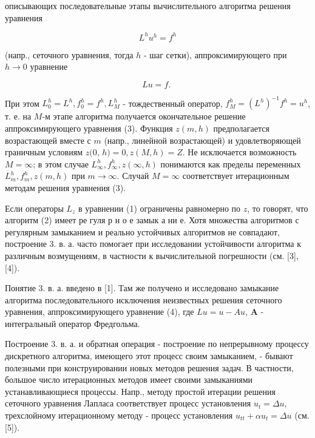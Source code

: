\documentclass[10pt]{article}
\begin{document}
описывающих последовательные этапы вычислительного алгоритма решения уравнения



\[

L^{h} u^{h}=f^{h}

\]



(напр., сеточного уравнения, тогда $h$ - шаг сетки), аппроксимирующего при $h \rightarrow 0$ уравнение



\[

L u=f \text {. }

\]



При этом $L_{0}^{h}=L^{h}, f_{0}^{h}=f^{h}, L_{M}^{h}$ - тождественный оператор, $f_{M}^{h}=\left(L^{h}\right)^{-1} f^{h}=u^{h}$, т. е. на $M$-м этапе алгоритма получается окончательное решение аппроксимирующего уравнения (3). Функция $z(m, h)$ предполагается возрастающей вместе с $m$ (напр., линейной возрастающей) и удовлетворяющей граничным условиям $z(0$, $h)=0, z(M, h)=Z$. Не исключается возможность $M=\infty$; в этом случае $L_{\infty}^{h}, f_{\infty}^{h}, z(\infty, h)$ понимаются как пределы переменных $L_{m}^{h}, f_{m}^{h}, z(m, h)$ при $m \rightarrow \infty$. Случай $M=\infty$ соответствует итерационным методам решения уравнения (3).



Если операторы $L_{z}$ в уравнении (1) ограничены равномерно по $z$, то говорят, что алгоритм (2) имеет ре гуля р н о е замык а ни е. Хотя множества алгоритмов с регулярным замыканием и реально устойчивых алгоритмов не совпадают, построение 3. в. а. часто помогает при исследовании устойчивости алгоритма к различным возмущениям, в частности к вычислительной погрешности (см. [3], [4]).



Понятие 3. в. а. введено в [1]. Там же получено и исследовано замыкание алгоритма последовательного исключения неизвестных решения сеточного уравнения, аппроксимирующего уравнение (4), где $L u=u-A u$, $\boldsymbol{A}$ - интегральный оператор Фредгольма.



Построение 3. в. а. и обратная операция - построение по непрерывному процессу дискретного алгоритма, имеющего этот процесс своим замыканием, - бывают полезными при конструировании новых методов решения задач. В частности, большое число итерационных методов имеет своими замыканиями устанавливающиеся процессы. Напр., методу простой итерации решения сеточного уравнения Лапласа соответствует процесс установления $u_{t}=\Delta u$, трехслойному итерационному методу - процесс установления $u_{t t}+\alpha u_{t}=\Delta u$ (см. [5]).
\end{document}
